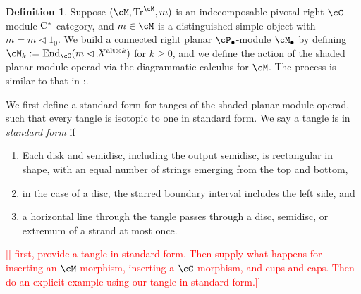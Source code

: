 \documentclass[11pt]{article}
\theoremstyle{plain}
\theoremstyle{definition}
\newtheorem{defn}[thm]{Definition}
\DeclareMathOperator{\End}{End}
\DeclareMathOperator{\Tr}{Tr}
\newcommand{\Cstar}{\rm{C^*}}
\newcommand{\nn}[1]{\textcolor{red}{[[#1]]}}
\begin{document}
\begin{defn}
Suppose $(\cM, \Tr^\cM, m)$ is an indecomposable pivotal right $\cC$-module $\Cstar$ category, and $m\in \cM$ is a distinguished simple object with $m= m \vartriangleleft 1_0$.
	We build a connected right planar $\cP_\bullet$-module $\cM_\bullet$ by defining $\cM_k := \End_\cC( m \vartriangleleft X^{\text{alt}\otimes k})$ for $k\geq 0$, and we define the action of the shaded planar module operad via the diagrammatic calculus for $\cM$. The process is similar to that in \cite[Def.~3.2]{MR2812459}:.
	
We first define a standard form for tanges of the shaded planar module operad, such that every tangle is isotopic to one in standard form. We say a tangle is in \textit{standard form} if 
\begin{enumerate}[label={\rm(SF\arabic*)}]
	\item Each disk and semidisc, including the output semidisc, is rectangular in shape, with an equal number of strings emerging from the top and bottom,
	\item in the case of a disc, the starred boundary interval includes the left side, and 
	\item a horizontal line through the tangle passes through a disc, semidisc, or extremum of a strand at most once. 
\end{enumerate}

\nn{
first, provide a tangle in standard form.
Then supply what happens for inserting an $\cM$-morphism, inserting a $\cC$-morphism, and cups and caps.
Then do an explicit example using our tangle in standard form.}


\end{defn}
\end{document}
